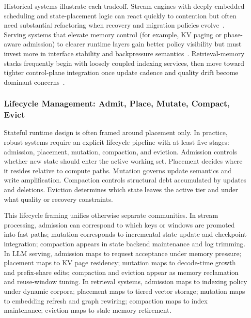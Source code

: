 \documentclass[acmsmall,screen,review]{acmart}
\begin{document}
Historical systems illustrate each tradeoff. Stream engines with deeply embedded scheduling and state-placement logic can react quickly to contention but often need substantial refactoring when recovery and migration policies evolve~\cite{zhang2020concurrent,zhao2024recovery}. Serving systems that elevate memory control (for example, KV paging or phase-aware admission) to clearer runtime layers gain better policy visibility but must invest more in interface stability and backpressure semantics~\cite{kwon2023pagedattention,agrawal2024sarathi,holmes2024fastgen}. Retrieval-memory stacks frequently begin with loosely coupled indexing services, then move toward tighter control-plane integration once update cadence and quality drift become dominant concerns~\cite{karpukhin2020dpr,zhang2026flowrag}.

\subsubsection{Lifecycle Management: Admit, Place, Mutate, Compact, Evict}

Stateful runtime design is often framed around placement only. In practice, robust systems require an explicit lifecycle pipeline with at least five stages: admission, placement, mutation, compaction, and eviction. Admission controls whether new state should enter the active working set. Placement decides where it resides relative to compute paths. Mutation governs update semantics and write amplification. Compaction controls structural debt accumulated by updates and deletions. Eviction determines which state leaves the active tier and under what quality or recovery constraints.

This lifecycle framing unifies otherwise separate communities. In stream processing, admission can correspond to which keys or windows are promoted into fast paths; mutation corresponds to incremental state update and checkpoint integration; compaction appears in state backend maintenance and log trimming. In LLM serving, admission maps to request acceptance under memory pressure; placement maps to KV page residency; mutation maps to decode-time growth and prefix-share edits; compaction and eviction appear as memory reclamation and reuse-window tuning. In retrieval systems, admission maps to indexing policy under dynamic corpora; placement maps to tiered vector storage; mutation maps to embedding refresh and graph rewiring; compaction maps to index maintenance; eviction maps to stale-memory retirement.
\end{document}
